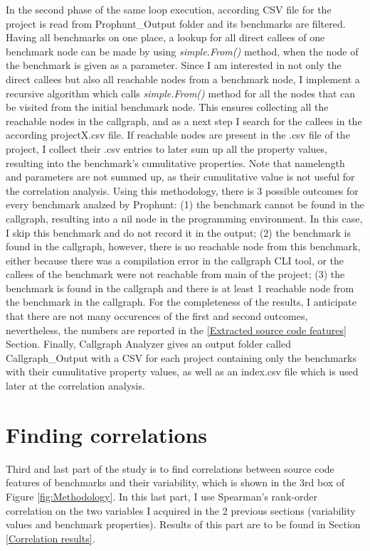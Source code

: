 \documentclass{seal_thesis}
\begin{document}
In the second phase of the same loop execution, according CSV file for the project is read from Prophunt\_Output folder and its benchmarks are filtered. Having all benchmarks on one place, a lookup for all direct callees of one benchmark node can be made by using \textit{simple.From()} method, when the node of the benchmark is given as a parameter. Since I am interested in not only the direct callees but also all reachable nodes from a benchmark node, I implement a recursive algorithm which calls \textit{simple.From()} method for all the nodes that can be visited from the initial benchmark node. This ensures collecting all the reachable nodes in the callgraph, and as a next step I search for the callees in the according projectX.csv file. If reachable nodes are present in the .csv file of the project, I collect their .csv entries to later sum up all the property values, resulting into the benchmark's cumulitative properties. Note that namelength and parameters are not summed up, as their cumulitative value is not useful for the correlation analysis. Using this methodology, there is 3 possible outcomes for every benchmark analzed by Prophunt: (1) the benchmark cannot be found in the callgraph, resulting into a nil node in the programming environment. In this case, I skip this benchmark and do not record it in the output; (2) the benchmark is found in the callgraph, however, there is no reachable node from this benchmark, either because there was a compilation error in the callgraph CLI tool, or the callees of the benchmark were not reachable from main of the project; (3) the benchmark is found in the callgraph and there is at least 1 reachable node from the benchmark in the callgraph. For the completeness of the results, I anticipate that there are not many occurences of the first and second outcomes, nevertheless, the numbers are reported in the \ref{Extracted source code features} Section. Finally, Callgraph Analyzer gives an output folder called Callgraph\_Output with a CSV for each project containing only the benchmarks with their cumulitative property values, as well as an index.csv file which is used later at the correlation analysis.

\section{Finding correlations}

Third and last part of the study is to find correlations between source code features of benchmarks and their variability, which is shown in the 3rd box of Figure \ref{fig:Methodology}. In this last part, I use Spearman's rank-order correlation on  the two variables I acquired in the 2 previous sections (variability values and benchmark properties). Results of this part are to be found in Section \ref{Correlation results}.
\end{document}
